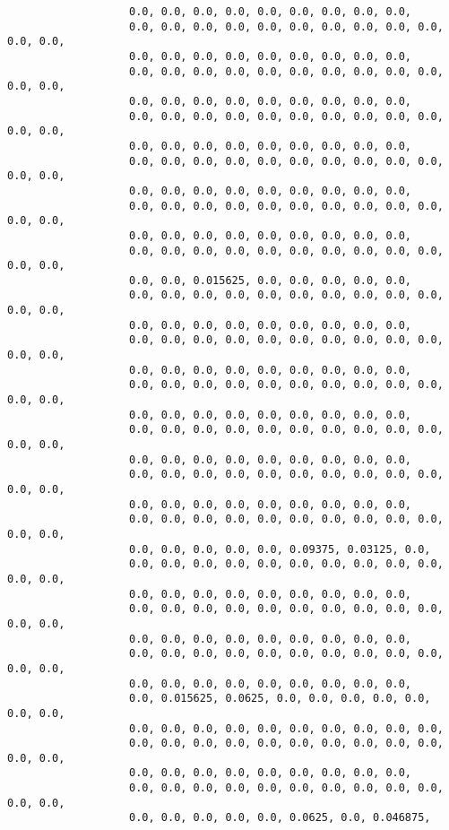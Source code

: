\begin{verbatim}
                   0.0, 0.0, 0.0, 0.0, 0.0, 0.0, 0.0, 0.0, 0.0,
                   0.0, 0.0, 0.0, 0.0, 0.0, 0.0, 0.0, 0.0, 0.0, 0.0, 0.0, 0.0,
                   0.0, 0.0, 0.0, 0.0, 0.0, 0.0, 0.0, 0.0, 0.0,
                   0.0, 0.0, 0.0, 0.0, 0.0, 0.0, 0.0, 0.0, 0.0, 0.0, 0.0, 0.0,
                   0.0, 0.0, 0.0, 0.0, 0.0, 0.0, 0.0, 0.0, 0.0,
                   0.0, 0.0, 0.0, 0.0, 0.0, 0.0, 0.0, 0.0, 0.0, 0.0, 0.0, 0.0,
                   0.0, 0.0, 0.0, 0.0, 0.0, 0.0, 0.0, 0.0, 0.0,
                   0.0, 0.0, 0.0, 0.0, 0.0, 0.0, 0.0, 0.0, 0.0, 0.0, 0.0, 0.0,
                   0.0, 0.0, 0.0, 0.0, 0.0, 0.0, 0.0, 0.0, 0.0,
                   0.0, 0.0, 0.0, 0.0, 0.0, 0.0, 0.0, 0.0, 0.0, 0.0, 0.0, 0.0,
                   0.0, 0.0, 0.0, 0.0, 0.0, 0.0, 0.0, 0.0, 0.0,
                   0.0, 0.0, 0.0, 0.0, 0.0, 0.0, 0.0, 0.0, 0.0, 0.0, 0.0, 0.0,
                   0.0, 0.0, 0.015625, 0.0, 0.0, 0.0, 0.0, 0.0,
                   0.0, 0.0, 0.0, 0.0, 0.0, 0.0, 0.0, 0.0, 0.0, 0.0, 0.0, 0.0,
                   0.0, 0.0, 0.0, 0.0, 0.0, 0.0, 0.0, 0.0, 0.0,
                   0.0, 0.0, 0.0, 0.0, 0.0, 0.0, 0.0, 0.0, 0.0, 0.0, 0.0, 0.0,
                   0.0, 0.0, 0.0, 0.0, 0.0, 0.0, 0.0, 0.0, 0.0,
                   0.0, 0.0, 0.0, 0.0, 0.0, 0.0, 0.0, 0.0, 0.0, 0.0, 0.0, 0.0,
                   0.0, 0.0, 0.0, 0.0, 0.0, 0.0, 0.0, 0.0, 0.0,
                   0.0, 0.0, 0.0, 0.0, 0.0, 0.0, 0.0, 0.0, 0.0, 0.0, 0.0, 0.0,
                   0.0, 0.0, 0.0, 0.0, 0.0, 0.0, 0.0, 0.0, 0.0,
                   0.0, 0.0, 0.0, 0.0, 0.0, 0.0, 0.0, 0.0, 0.0, 0.0, 0.0, 0.0,
                   0.0, 0.0, 0.0, 0.0, 0.0, 0.0, 0.0, 0.0, 0.0,
                   0.0, 0.0, 0.0, 0.0, 0.0, 0.0, 0.0, 0.0, 0.0, 0.0, 0.0, 0.0,
                   0.0, 0.0, 0.0, 0.0, 0.0, 0.09375, 0.03125, 0.0,
                   0.0, 0.0, 0.0, 0.0, 0.0, 0.0, 0.0, 0.0, 0.0, 0.0, 0.0, 0.0,
                   0.0, 0.0, 0.0, 0.0, 0.0, 0.0, 0.0, 0.0, 0.0,
                   0.0, 0.0, 0.0, 0.0, 0.0, 0.0, 0.0, 0.0, 0.0, 0.0, 0.0, 0.0,
                   0.0, 0.0, 0.0, 0.0, 0.0, 0.0, 0.0, 0.0, 0.0,
                   0.0, 0.0, 0.0, 0.0, 0.0, 0.0, 0.0, 0.0, 0.0, 0.0, 0.0, 0.0,
                   0.0, 0.0, 0.0, 0.0, 0.0, 0.0, 0.0, 0.0, 0.0,
                   0.0, 0.015625, 0.0625, 0.0, 0.0, 0.0, 0.0, 0.0, 0.0, 0.0,
                   0.0, 0.0, 0.0, 0.0, 0.0, 0.0, 0.0, 0.0, 0.0, 0.0,
                   0.0, 0.0, 0.0, 0.0, 0.0, 0.0, 0.0, 0.0, 0.0, 0.0, 0.0, 0.0,
                   0.0, 0.0, 0.0, 0.0, 0.0, 0.0, 0.0, 0.0, 0.0,
                   0.0, 0.0, 0.0, 0.0, 0.0, 0.0, 0.0, 0.0, 0.0, 0.0, 0.0, 0.0,
                   0.0, 0.0, 0.0, 0.0, 0.0, 0.0625, 0.0, 0.046875,

\end{verbatim}
